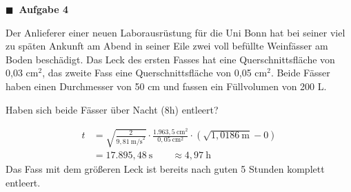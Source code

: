 \documentclass[aspectratio=169,9pt]{beamer}
\newcommand{\pp}{\par \vspace*{2mm}}
\newcommand{\antwort}[1]{
\begin{tcolorbox}[
	enhanced,
	colframe=unigrau!65,
	sharp corners,
	boxsep=1pt,
	colback=white,
	coltitle=black,
]
	#1
	\end{tcolorbox}
}
\begin{document}
%

\begin{frame}

\begin{minipage}{.4\textwidth}
\small
{\color{miugray}$\blacksquare ~$} \textbf{Aufgabe 4} \par \vspace*{2mm}
Der Anlieferer einer neuen Laborausrüstung für die Uni Bonn hat bei seiner viel zu späten Ankunft am Abend in seiner Eile zwei voll befüllte Weinfässer am Boden beschädigt. Das Leck des ersten Fasses hat eine Querschnittsfläche von 0,03 cm$^2$, das zweite Fass eine Querschnittsfläche von 0,05 cm$^2$. Beide Fässer haben einen Durchmesser von 50 cm und fassen ein Füllvolumen von 200 L.
\pp
Haben sich beide Fässer über Nacht (8h) entleert?

\end{minipage}\hspace*{4mm}
\begin{minipage}{.6\textwidth}
\antwort{
\footnotesize
\begin{align*}
t &= \sqrt{\frac{2}{9,81~\text{m/s}^2}} \cdot \frac{1.963,5~\text{cm}^2}{0,05~\text{cm}^2} \cdot \left(\sqrt{1,0186~\text{m}} - 0 \right) \\
 &= 17.895,48~\text{s} \qquad \approx 4,97~\text{h}
\end{align*}
Das Fass mit dem größeren Leck ist bereits nach guten 5 Stunden komplett entleert.
}
\end{minipage}

\end{frame}
\end{document}
